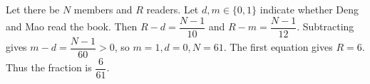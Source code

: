 Let there be $N$ members and $R$ readers. Let $d,m\in\{0,1\}$ indicate whether Deng and Mao read the book. Then $R-d=\dfrac{N-1}{10}$ and $R-m=\dfrac{N-1}{12}$. Subtracting gives $m-d=\dfrac{N-1}{60}>0$, so $m=1,d=0,N=61$. The first equation gives $R=6$. Thus the fraction is $\boxed{\dfrac{6}{61}}$.
